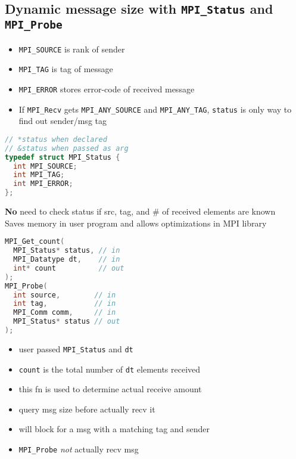 \subsection*{Dynamic message size with \texttt{MPI\_Status} and \texttt{MPI\_Probe}}
\begin{minipage}{0.5\linewidth}
  \flushleft
  \begin{itemize}
  \item \texttt{MPI\_SOURCE} is rank of sender
  \item \texttt{MPI\_TAG} is tag of message
  \item \texttt{MPI\_ERROR} stores error-code of received message
  \item If \texttt{MPI\_Recv} gets \texttt{MPI\_ANY\_SOURCE} and \texttt{MPI\_ANY\_TAG}, \texttt{status} is only way to find out sender/msg tag
  \end{itemize}
\end{minipage}
\begin{minipage}{0.5\linewidth}
\begin{lstlisting}[language=C,xleftmargin=0pt]
// *status when declared
// &status when passed as arg
typedef struct MPI_Status {
  int MPI_SOURCE;
  int MPI_TAG;
  int MPI_ERROR;
};
\end{lstlisting}
\end{minipage}
\textbf{No} need to check status if src, tag, and $\#$ of received elements are known\\
Saves memory in user program and allows optimizations in MPI library

\begin{minipage}{0.5\linewidth}
\begin{lstlisting}[language=C,xleftmargin=1pt,xrightmargin=5pt]
MPI_Get_count(
  MPI_Status* status, // in
  MPI_Datatype dt,    // in
  int* count          // out
);
MPI_Probe(
  int source,        // in
  int tag,           // in
  MPI_Comm comm,     // in
  MPI_Status* status // out
);
\end{lstlisting}
\end{minipage}
\begin{minipage}{0.5\linewidth}
  \flushleft
  \begin{itemize}
  \item user passed \texttt{MPI\_Status} and \texttt{dt}
  \item \texttt{count} is the total number of \texttt{dt} elements received
  \item this fn is used to determine actual receive amount
  \item query msg size before actually recv it
  \item will block for a msg with a matching tag and sender
  \item \texttt{MPI\_Probe} \emph{not} actually recv msg
  \end{itemize}
\end{minipage}

